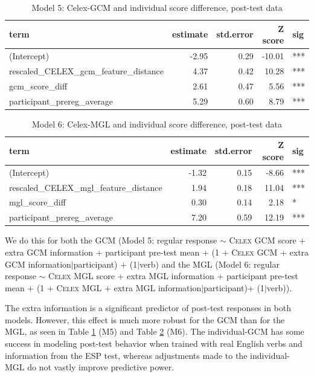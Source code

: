 \documentclass[12pt]{article}
\begin{document}
\begin{table}[ht]
\centering
\begin{tabular}{lrrrl}
  \hline
term & estimate & std.error & Z score & sig \\ 
  \hline
(Intercept) & -2.95 & 0.29 & -10.01 & *** \\ 
  rescaled\_CELEX\_gcm\_feature\_distance & 4.37 & 0.42 & 10.28 & *** \\ 
  gcm\_score\_diff & 2.61 & 0.47 & 5.56 & *** \\ 
  participant\_prereg\_average & 5.29 & 0.60 & 8.79 & *** \\ 
   \hline
\end{tabular}
\caption{Model 5: Celex-GCM and individual score difference, post-test data} 
\label{indiv1}
\end{table}
\begin{table}[ht]
\centering
\begin{tabular}{lrrrl}
  \hline
term & estimate & std.error & Z score & sig \\ 
  \hline
(Intercept) & -1.32 & 0.15 & -8.66 & *** \\ 
  rescaled\_CELEX\_mgl\_feature\_distance & 1.94 & 0.18 & 11.04 & *** \\ 
  mgl\_score\_diff & 0.30 & 0.14 & 2.18 & * \\ 
  participant\_prereg\_average & 7.20 & 0.59 & 12.19 & *** \\ 
   \hline
\end{tabular}
\caption{Model 6: Celex-MGL and individual score difference, post-test data} 
\label{indiv2}
\end{table}
We do this for both the GCM  (Model 5: regular response  $\sim$ \textsc{Celex} GCM score + extra GCM information + participant pre-test mean + (1 + \textsc{Celex} GCM + extra GCM information$|$participant) + (1$|$verb) and the MGL (Model 6: regular response  $\sim$ \textsc{Celex} MGL score + extra MGL information + participant pre-test mean + (1 + \textsc{Celex} MGL + extra MGL information$|$participant)+ (1$|$verb)).

The extra information is a significant predictor of post-test responses in both models. However, this effect is much more robust for the GCM than for the MGL, as seen in Table \ref{indiv1} (M5) and Table \ref{indiv2} (M6). The individual-GCM has some success in modeling post-test behavior when trained with real English verbs and information from the ESP test, whereas adjustments made to the individual-MGL do not vastly improve predictive power. 
\end{document}
